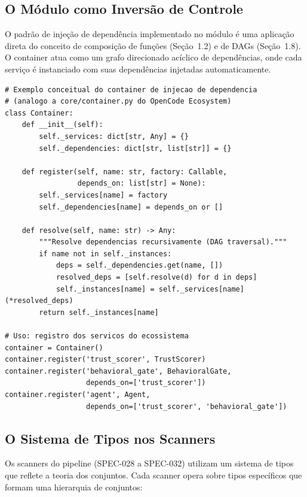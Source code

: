 \subsection{O Módulo  como Inversão de Controle}

O padrão de injeção de dependência implementado no módulo
 é uma aplicação direta do conceito de composição de
funções (Seção~1.2) e de DAGs (Seção~1.8). O container atua como um grafo
direcionado acíclico de dependências, onde cada serviço é instanciado com
suas dependências injetadas automaticamente.

\begin{lstlisting}[style=pythonstyle]
# Exemplo conceitual do container de injecao de dependencia
# (analogo a core/container.py do OpenCode Ecosystem)
class Container:
    def __init__(self):
        self._services: dict[str, Any] = {}
        self._dependencies: dict[str, list[str]] = {}

    def register(self, name: str, factory: Callable,
                 depends_on: list[str] = None):
        self._services[name] = factory
        self._dependencies[name] = depends_on or []

    def resolve(self, name: str) -> Any:
        """Resolve dependencias recursivamente (DAG traversal)."""
        if name not in self._instances:
            deps = self._dependencies.get(name, [])
            resolved_deps = [self.resolve(d) for d in deps]
            self._instances[name] = self._services[name](*resolved_deps)
        return self._instances[name]

# Uso: registro dos servicos do ecossistema
container = Container()
container.register('trust_scorer', TrustScorer)
container.register('behavioral_gate', BehavioralGate,
                   depends_on=['trust_scorer'])
container.register('agent', Agent,
                   depends_on=['trust_scorer', 'behavioral_gate'])
\end{lstlisting}

\subsection{O Sistema de Tipos nos Scanners}

Os scanners do pipeline (SPEC-028 a SPEC-032) utilizam um sistema de tipos
que reflete a teoria dos conjuntos. Cada scanner opera sobre tipos
específicos que formam uma hierarquia de conjuntos:

